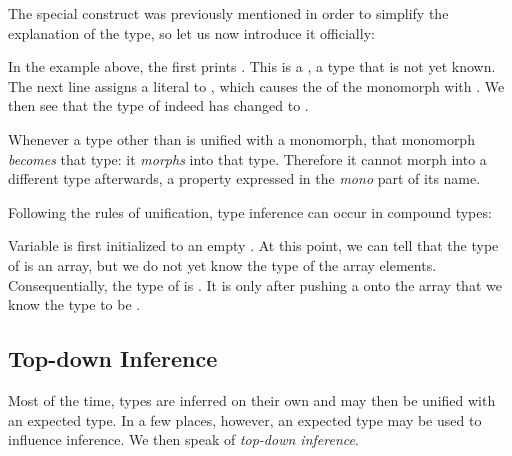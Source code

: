 The special construct  was previously mentioned in order to simplify the explanation of the  type, so let us now introduce it officially:


In the example above, the first  prints . This is a , a type that is not yet known. The next line  assigns a  literal to , which causes the  of the monomorph with . We then see that the type of  indeed has changed to .

Whenever a type other than  is unified with a monomorph, that monomorph \emph{becomes} that type: it \emph{morphs} into that type. Therefore it cannot morph into a different type afterwards, a property expressed in the \emph{mono} part of its name.

Following the rules of unification, type inference can occur in compound types:

Variable  is first initialized to an empty . At this point, we can tell that the type of  is an array, but we do not yet know the type of the array elements. Consequentially, the type of  is . It is only after pushing a  onto the array that we know the type to be .


\subsection{Top-down Inference}
\label{type-system-top-down-inference}

Most of the time, types are inferred on their own and may then be unified with an expected type. In a few places, however, an expected type may be used to influence inference. We then speak of \emph{top-down inference}.



